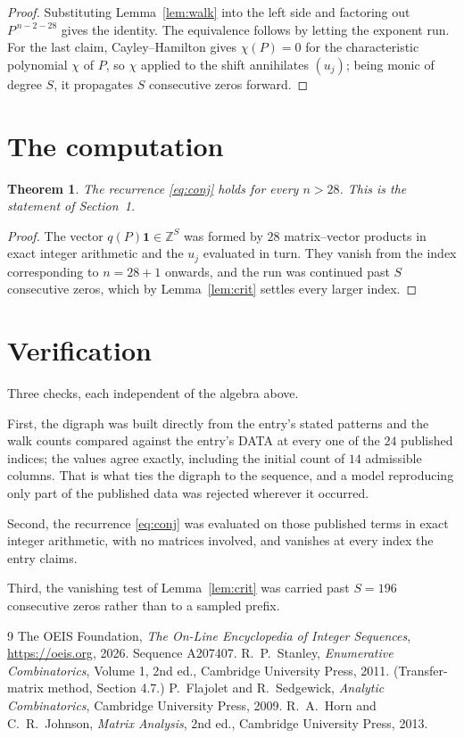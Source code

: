 \documentclass[11pt,a4paper]{article}
\theoremstyle{plain}
\newtheorem{theorem}{Theorem}
\theoremstyle{definition}
\begin{document}
\begin{proof}
Substituting Lemma~\ref{lem:walk} into the left side and factoring out
$P^{\,n-2-28}$ gives the identity. The equivalence follows by letting the exponent
run. For the last claim, Cayley--Hamilton gives $\chi(P)=0$ for the characteristic
polynomial $\chi$ of $P$, so $\chi$ applied to the shift annihilates $(u_j)$; being monic of
degree $S$, it propagates $S$ consecutive zeros forward.
\end{proof}

\section{The computation}

\begin{theorem}
The recurrence \eqref{eq:conj} holds for every $n>28$. This is the statement of
Section~1.
\end{theorem}

\begin{proof}
The vector $q(P)\mathbf{1}\in\mathbb{Z}^{S}$ was formed by $28$ matrix--vector
products in exact integer arithmetic and the $u_j$ evaluated in turn. They vanish from the
index corresponding to $n=28+1$ onwards, and the run was continued past $S$ consecutive
zeros, which by Lemma~\ref{lem:crit} settles every larger index.
\end{proof}

\section{Verification}

Three checks, each independent of the algebra above.

First, the digraph was built directly from the entry's stated patterns and the walk counts
compared against the entry's DATA at every one of the $24$ published indices; the
values agree exactly, including the initial count of $14$ admissible columns. That is
what ties the digraph to the sequence, and a model reproducing only part of the published
data was rejected wherever it occurred.

Second, the recurrence \eqref{eq:conj} was evaluated on those published terms in exact
integer arithmetic, with no matrices involved, and vanishes at every index the entry claims.

Third, the vanishing test of Lemma~\ref{lem:crit} was carried past $S=196$ consecutive
zeros rather than to a sampled prefix.

\begin{thebibliography}{9}
 The OEIS Foundation, \emph{The On-Line Encyclopedia of Integer
Sequences}, \url{https://oeis.org}, 2026. Sequence A207407.
 R.~P.~Stanley, \emph{Enumerative Combinatorics}, Volume 1, 2nd ed.,
Cambridge University Press, 2011. (Transfer-matrix method, Section 4.7.)
 P.~Flajolet and R.~Sedgewick, \emph{Analytic Combinatorics}, Cambridge
University Press, 2009.
 R.~A.~Horn and C.~R.~Johnson, \emph{Matrix Analysis}, 2nd ed., Cambridge
University Press, 2013.
\end{thebibliography}
\end{document}
